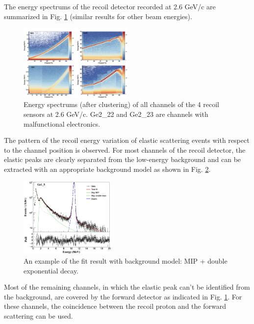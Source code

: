 \documentclass[number,5p]{elsarticle}
\begin{document}
The energy spectrums of the recoil detector recorded at 2.6 GeV/c are
summarized in Fig. \ref{fig:e_map} (similar results for other beam energies). 
\begin{figure}[htb!]
  \centering
  \includegraphics[width=0.5\textwidth]{./e_map.png}
  \caption{Energy spectrums (after clustering) of all channels of the 4 recoil
    sensors at 2.6 GeV/c. Ge2\_22 and Ge2\_23 are channels with malfunctional electronics.}
  \label{fig:e_map}
\end{figure}
The pattern of the recoil energy variation of elastic scattering events with respect to the channel position is observed.
For most channels of the recoil detector, the elastic peaks are clearly
separated from the low-energy background
and can be extracted with an appropriate background model as shown in Fig. \ref{fig:e_fit}.
\begin{figure}[h!]
  \centering
  \includegraphics[width=0.42\textwidth]{./e_fit.png}
  \caption{An example of the fit result with background model: MIP + double
    exponential decay.}
  \label{fig:e_fit}
\end{figure}
Most of the remaining channels, in which the elastic peak can't be identified from the
background, are covered by the forward detector as indicated in Fig. \ref{fig:e_map}.
For these channels, the coincidence between the recoil proton and the forward
scattering can be used.
\end{document}
